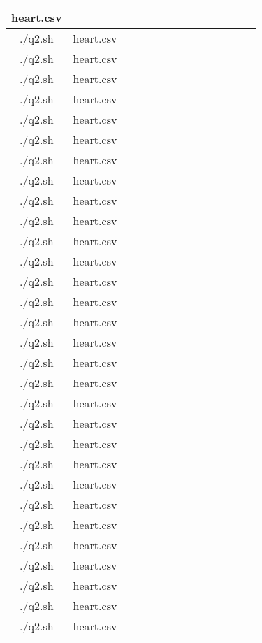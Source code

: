 \documentclass{article}
\begin{document}
\begin{table}[h!]
\begin{tabular}{|c|c|c|c|c|c|c|c|c|c|c|c|c|c|}
heart.csv &  &  &  &  &  &  &  &  &  &  &  &  \\ \hline./q2.sh & heart.csv &  &  &  &  &  &  &  &  &  &  &  &  \\ \hline./q2.sh & heart.csv &  &  &  &  &  &  &  &  &  &  &  &  \\ \hline./q2.sh & heart.csv &  &  &  &  &  &  &  &  &  &  &  &  \\ \hline./q2.sh & heart.csv &  &  &  &  &  &  &  &  &  &  &  &  \\ \hline./q2.sh & heart.csv &  &  &  &  &  &  &  &  &  &  &  &  \\ \hline./q2.sh & heart.csv &  &  &  &  &  &  &  &  &  &  &  &  \\ \hline./q2.sh & heart.csv &  &  &  &  &  &  &  &  &  &  &  &  \\ \hline./q2.sh & heart.csv &  &  &  &  &  &  &  &  &  &  &  &  \\ \hline./q2.sh & heart.csv &  &  &  &  &  &  &  &  &  &  &  &  \\ \hline./q2.sh & heart.csv &  &  &  &  &  &  &  &  &  &  &  &  \\ \hline./q2.sh & heart.csv &  &  &  &  &  &  &  &  &  &  &  &  \\ \hline./q2.sh & heart.csv &  &  &  &  &  &  &  &  &  &  &  &  \\ \hline./q2.sh & heart.csv &  &  &  &  &  &  &  &  &  &  &  &  \\ \hline./q2.sh & heart.csv &  &  &  &  &  &  &  &  &  &  &  &  \\ \hline./q2.sh & heart.csv &  &  &  &  &  &  &  &  &  &  &  &  \\ \hline./q2.sh & heart.csv &  &  &  &  &  &  &  &  &  &  &  &  \\ \hline./q2.sh & heart.csv &  &  &  &  &  &  &  &  &  &  &  &  \\ \hline./q2.sh & heart.csv &  &  &  &  &  &  &  &  &  &  &  &  \\ \hline./q2.sh & heart.csv &  &  &  &  &  &  &  &  &  &  &  &  \\ \hline./q2.sh & heart.csv &  &  &  &  &  &  &  &  &  &  &  &  \\ \hline./q2.sh & heart.csv &  &  &  &  &  &  &  &  &  &  &  &  \\ \hline./q2.sh & heart.csv &  &  &  &  &  &  &  &  &  &  &  &  \\ \hline./q2.sh & heart.csv &  &  &  &  &  &  &  &  &  &  &  &  \\ \hline./q2.sh & heart.csv &  &  &  &  &  &  &  &  &  &  &  &  \\ \hline./q2.sh & heart.csv &  &  &  &  &  &  &  &  &  &  &  &  \\ \hline./q2.sh & heart.csv &  &  &  &  &  &  &  &  &  &  &  &  \\ \hline./q2.sh & heart.csv &  &  &  &  &  &  &  &  &  &  &  &  \\ \hline./q2.sh & heart.csv &  &  &  &  &  &  &  &  &  &  &  &  \\ \hline./q2.sh & heart.csv &  &  &  &  &  &  &  &  &  &  &  &  \\ \hline./q2.sh & heart.csv &  &  &  &  &  &  &  &  &  &  &  &  \\ 
\end{tabular}
\end{table}
\end{document}
